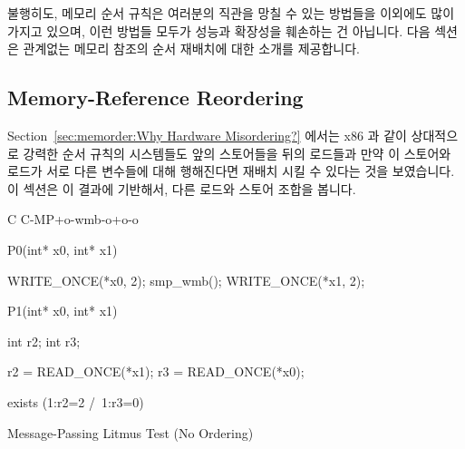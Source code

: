 불행히도, 메모리 순서 규칙은 여러분의 직관을 망칠 수 있는 방법들을 이외에도
많이 가지고 있으며, 이런 방법들 모두가 성능과 확장성을 훼손하는 건 아닙니다.
다음 섹션은 관계없는 메모리 참조의 순서 재배치에 대한 소개를 제공합니다.

\subsection{Memory-Reference Reordering}
\label{sec:memorder:Memory-Reference Reordering}

Section~\ref{sec:memorder:Why Hardware Misordering?}
에서는 x86 과 같이 상대적으로 강력한 순서 규칙의 시스템들도 앞의 스토어들을
뒤의 로드들과 만약 이 스토어와 로드가 서로 다른 변수들에 대해 행해진다면 재배치
시킬 수 있다는 것을 보였습니다.
이 섹션은 이 결과에 기반해서, 다른 로드와 스토어 조합을 봅니다.

\begin{listing}[tbp]
{ \scriptsize
\begin{verbbox}[\LstLineNo]
C C-MP+o-wmb-o+o-o

{
}


P0(int* x0, int* x1) {

  WRITE_ONCE(*x0, 2);
  smp_wmb();
  WRITE_ONCE(*x1, 2);

}

P1(int* x0, int* x1) {

  int r2;
  int r3;

  r2 = READ_ONCE(*x1);
  r3 = READ_ONCE(*x0);

}

exists (1:r2=2 /\ 1:r3=0)
\end{verbbox}
}
\centering
\theverbbox
\caption{Message-Passing Litmus Test (No Ordering)}
\label{lst:memorder:Message-Passing Litmus Test (No Ordering)}
\end{listing}

